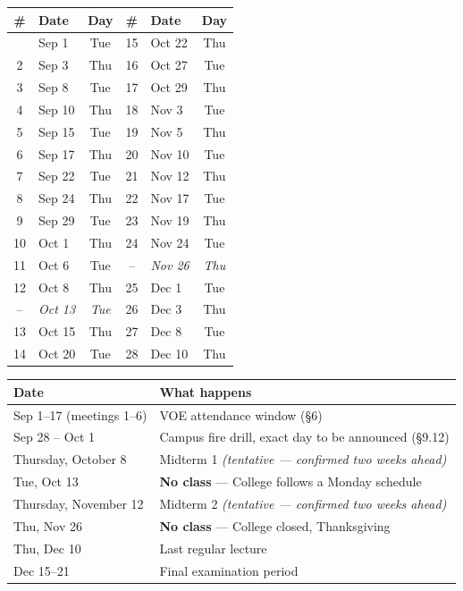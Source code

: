 \documentclass[11pt]{article}
\newcommand{\midtermone}{Thursday, October 8}
\newcommand{\midtermtwo}{Thursday, November 12}
\begin{document}
\begin{center}
\renewcommand{\arraystretch}{1.15}
\begin{longtable}{@{} c l c @{\hspace{2em}} c l c @{}}
\toprule
\textbf{\#} & \textbf{Date} & \textbf{Day} &
\textbf{\#} & \textbf{Date} & \textbf{Day} \\
\midrule
\endhead
\bottomrule
\endlastfoot
1  & Sep 1  & Tue & 15 & Oct 22 & Thu \\
2  & Sep 3  & Thu & 16 & Oct 27 & Tue \\
3  & Sep 8  & Tue & 17 & Oct 29 & Thu \\
4  & Sep 10 & Thu & 18 & Nov 3  & Tue \\
5  & Sep 15 & Tue & 19 & Nov 5  & Thu \\
6  & Sep 17 & Thu & 20 & Nov 10 & Tue \\
7  & Sep 22 & Tue & 21 & Nov 12 & Thu \\
8  & Sep 24 & Thu & 22 & Nov 17 & Tue \\
9  & Sep 29 & Tue & 23 & Nov 19 & Thu \\
10 & Oct 1  & Thu & 24 & Nov 24 & Tue \\
11 & Oct 6  & Tue & -- & \emph{Nov 26} & \emph{Thu} \\
12 & Oct 8  & Thu & 25 & Dec 1  & Tue \\
-- & \emph{Oct 13} & \emph{Tue} & 26 & Dec 3  & Thu \\
13 & Oct 15 & Thu & 27 & Dec 8  & Tue \\
14 & Oct 20 & Tue & 28 & Dec 10 & Thu \\
\end{longtable}
\end{center}

\begin{center}
\renewcommand{\arraystretch}{1.25}
\begin{tabular}{@{} l l @{}}
\toprule
\textbf{Date} & \textbf{What happens} \\
\midrule
Sep 1--17 (meetings 1--6) & VOE attendance window (\S6) \\
Sep 28 -- Oct 1           & Campus fire drill, exact day to be announced (\S9.12) \\
\midtermone               & Midterm 1 \emph{(tentative --- confirmed two weeks ahead)} \\
Tue, Oct 13               & \textbf{No class} --- College follows a Monday schedule \\
\midtermtwo               & Midterm 2 \emph{(tentative --- confirmed two weeks ahead)} \\
Thu, Nov 26               & \textbf{No class} --- College closed, Thanksgiving \\
Thu, Dec 10               & Last regular lecture \\
Dec 15--21                & Final examination period \\
\bottomrule
\end{tabular}
\end{center}
\end{document}
